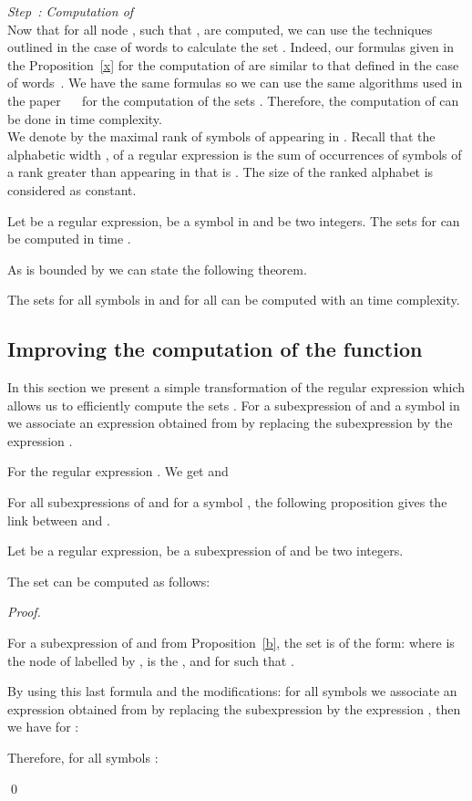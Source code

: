 \documentclass{llncs}
\begin{document}
\noindent\emph{Step~: Computation of }\\

Now that  for all node , such that , are computed, we can use the techniques outlined in the case of words to calculate the set .  
Indeed, our formulas given in the Proposition~\ref{x} for the computation of  are similar to that defined in the case of words~\cite{Brug,ZPC}. We have the same formulas so we can use the same algorithms used in the paper ~~\cite{ZPC} for the computation of the sets .
Therefore, the computation of   can be done in  time complexity.\\

We denote by  the maximal rank of symbols of  appearing in . Recall that the alphabetic width , of a regular expression  is the sum of occurrences of symbols of a rank greater than  appearing in  that is . The size of the ranked alphabet  is considered as constant. 
\begin{lemma}\label{lemcomplex}
Let  be a regular expression,  be a symbol in  and  be two integers. The sets  for  can be computed in time .
\end{lemma}
As  is bounded by  we can state the following theorem.
\begin{theorem}\label{thmcomplex}
The sets  for all symbols  in  and for all  can be computed with an  time complexity.
\end{theorem}
\subsection{Improving the computation of the function }
In this section we present a simple transformation of the regular expression  which allows us to efficiently compute the sets . For a subexpression  of  and a symbol  in  we associate an expression  obtained from  by replacing the subexpression  by the expression . 
\begin{example}    
For the regular expression . We get  and 
\end{example}
For all subexpressions  of  and for a symbol , the following proposition gives the link between  and .  


\begin{proposition}\label{propFw}
Let  be a regular expression,  be a subexpression of  and  be two integers. 
 
 The set  can be computed as follows: 
 
\end{proposition}
\begin{proof}
\begin{sloppy}  
  
 For a subexpression  of  and from Proposition~\ref{b}, the set  is of the form: 
 where  is the node of  labelled by ,  is the ,  and for  such that . 
 
  
By using this last formula and the modifications: for all symbols  we associate an expression 
 obtained from  by replacing the subexpression  by the expression , then we have for :
 
Therefore, for all symbols : 

\end{sloppy}   
 \qed
\end{proof}
\end{document}
